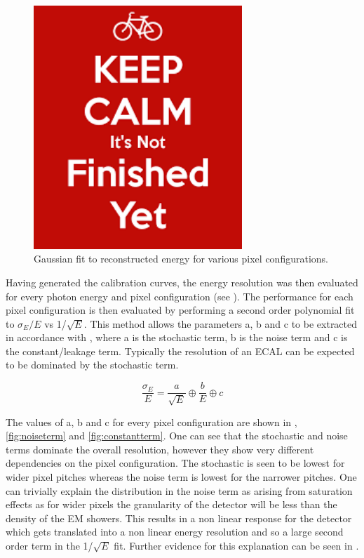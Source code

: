 \begin{figure}
  \centering
  \includegraphics[width=0.7\textwidth,keepaspectratio]{DECALStudies/fig/dummy}
  \caption{Gaussian fit to reconstructed energy for various pixel configurations.}
  \label{fig:gausfits}
\end{figure}

Having generated the calibration curves, the energy resolution was then evaluated for every photon energy and pixel configuration (see ). The performance for each pixel configuration is then evaluated by performing a second order polynomial fit to $\sigma_E/E$ vs 1/$\sqrt{E}$. This method allows the parameters a, b and c to be extracted in accordance with , where a is the stochastic term, b is the noise term and c is the constant/leakage term. Typically the resolution of an \ac{ECAL} can be expected to be dominated by the stochastic term.

\begin{equation}
  \label{eq:resolutionformula}
  \frac{\sigma_E}{E}=\frac{a}{\sqrt{E}} \oplus \frac{b}{E} \oplus c
\end{equation}

The values of a, b and c for every pixel configuration are shown in , \ref{fig:noiseterm} and \ref{fig:constantterm}. One can see that the stochastic and noise terms dominate the overall resolution, however they show very different dependencies on the pixel configuration. The stochastic is seen to be lowest for wider pixel pitches whereas the noise term is lowest for the narrower pitches. One can trivially explain the distribution in the noise term as arising from saturation effects as for wider pixels the granularity of the detector will be less than the density of the EM showers. This results in a non linear response for the detector which gets translated into a non linear energy resolution and so a large second order term in the 1/$\sqrt{E}$ fit. Further evidence for this explanation can be seen in .

